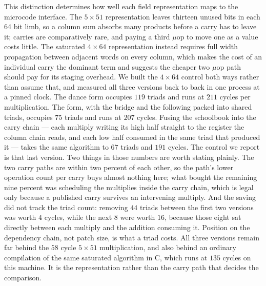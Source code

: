 This distinction determines how well each field representation maps to the microcode interface.
The $5\times51$ representation leaves thirteen unused bits in each 64 bit limb, so a column sum absorbs many products before a carry has to leave it; carries are comparatively rare, and paying a third $\mu$op to move one as a value costs little.
The saturated $4\times64$ representation instead requires full width propagation between adjacent words on every column, which makes the cost of an individual carry the dominant term and suggests the cheaper two $\mu$op path should pay for its staging overhead.
We built the $4\times64$ control both ways rather than assume that, and measured all three versions back to back in one process at a pinned clock.
The  dance form occupies $119$ triads and runs at $211$ cycles per multiplication.
The  form, with the bridge and the following  packed into shared triads, occupies $75$ triads and runs at $207$ cycles.
Fusing the schoolbook into the carry chain --- each multiply writing its high half straight to the register the column chain reads, and each low half consumed in the same triad that produced it --- takes the same algorithm to $67$ triads and $191$ cycles.
The control we report is that last version.
Two things in those numbers are worth stating plainly.
The two carry paths are within two percent of each other, so the  path's lower operation count per carry buys almost nothing here; what bought the remaining nine percent was scheduling the multiplies inside the carry chain, which is legal only because a published carry survives an intervening multiply.
And the saving did not track the triad count: removing $44$ triads between the first two versions was worth $4$ cycles, while the next $8$ were worth $16$, because those eight sat directly between each multiply and the addition consuming it.
Position on the dependency chain, not patch size, is what a triad costs.
All three versions remain far behind the $58$ cycle $5\times51$ multiplication, and also behind an ordinary  compilation of the same saturated algorithm in C, which runs at $135$ cycles on this machine.
It is the representation rather than the carry path that decides the comparison.
